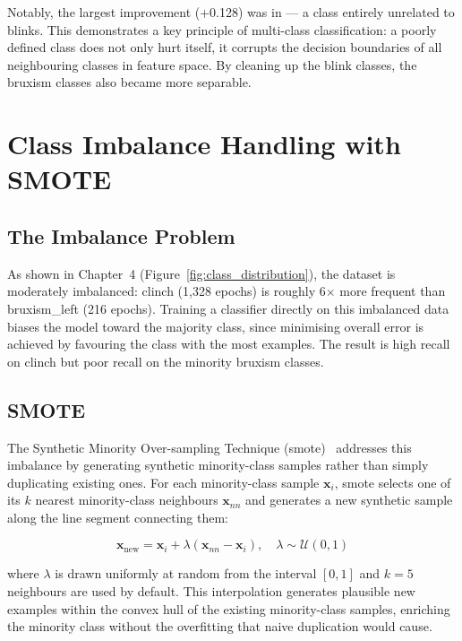 Notably, the largest improvement (+0.128) was in
 — a class entirely unrelated to blinks. This
demonstrates a key principle of multi-class classification: a
poorly defined class does not only hurt itself, it corrupts the
decision boundaries of all neighbouring classes in feature space.
By cleaning up the blink classes, the bruxism classes also became
more separable.

\section{Class Imbalance Handling with SMOTE}
\label{sec:cl_imbalance}

\subsection{The Imbalance Problem}

As shown in Chapter~4 (Figure~\ref{fig:class_distribution}), the
dataset is moderately imbalanced: clinch (1{,}328 epochs) is roughly
6$\times$ more frequent than bruxism\_left (216 epochs). Training a
classifier directly on this imbalanced data biases the model toward
the majority class, since minimising overall error is achieved by
favouring the class with the most examples. The result is high
recall on clinch but poor recall on the minority bruxism classes.

\subsection{SMOTE}

The Synthetic Minority Over-sampling Technique
(\acrshort{smote})~\cite{chawla2002smote} addresses this imbalance
by generating synthetic minority-class samples rather than simply
duplicating existing ones. For each minority-class sample
$\mathbf{x}_i$, \acrshort{smote} selects one of its $k$ nearest
minority-class neighbours $\mathbf{x}_{nn}$ and generates a new
synthetic sample along the line segment connecting them:

\begin{equation}
\mathbf{x}_{\text{new}} = \mathbf{x}_i + \lambda
\left(\mathbf{x}_{nn} - \mathbf{x}_i\right),
\quad \lambda \sim \mathcal{U}(0, 1)
\label{eq:smote}
\end{equation}

\noindent where $\lambda$ is drawn uniformly at random from the
interval $[0, 1]$ and $k = 5$ neighbours are used by default. This
interpolation generates plausible new examples within the convex
hull of the existing minority-class samples, enriching the minority
class without the overfitting that naive duplication would cause.

